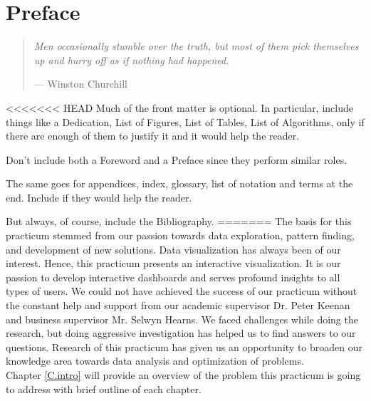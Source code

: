 %
%
%
%

\chapter*{Preface}


\begin{quote}
\noindent\textit{Men occasionally stumble over the truth, but most of them pick themselves up and
hurry off as if nothing had happened.}

\hspace{2cm}--- Winston Churchill
\end{quote}

<<<<<<< HEAD
Much of the front matter is optional. In particular, include things like a Dedication, List of Figures, List of Tables, List of Algorithms, only if there are enough of them to justify it and it would help the reader.

Don't include both a Foreword and a Preface since they perform similar roles.

The same goes for appendices, index, glossary, list of notation and terms at the end. Include if they would help the reader.

But always, of course, include the Bibliography.
=======
The basis for this practicum stemmed from our passion towards data exploration, pattern finding, and development of new solutions. Data visualization has always been of our interest. Hence, this practicum presents an interactive visualization. It is our passion to develop interactive dashboards and serves profound insights to all types of users. We could not have achieved the success of our practicum without the constant help and support from our academic supervisor Dr. Peter Keenan and business supervisor Mr. Selwyn Hearns. We faced challenges while doing the research, but doing aggressive investigation has helped us to find answers to our questions. Research of this practicum has given us an opportunity to broaden our knowledge area towards data analysis and optimization of problems.\\

Chapter \ref{C.intro} will provide an overview of the problem this practicum is going to address with brief outline of each chapter.\\

